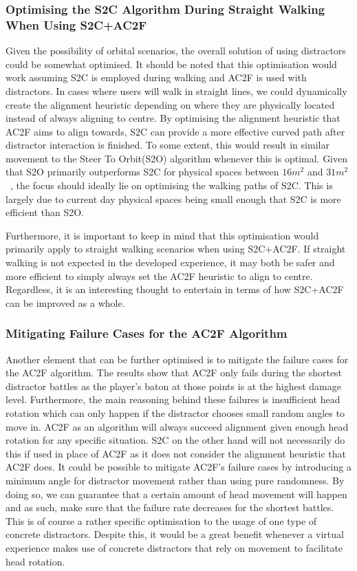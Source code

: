 \subsubsection{Optimising the S2C Algorithm During Straight Walking When Using S2C+AC2F}
Given the possibility of orbital scenarios, the overall solution of using distractors could be somewhat optimised. It should be noted that this optimisation would work assuming S2C is employed during walking and AC2F is used with distractors. In cases where users will walk in straight lines, we could dynamically create the alignment heuristic depending on where they are physically located instead of always aligning to centre. By optimising the alignment heuristic that AC2F aims to align towards, S2C can provide a more effective curved path after distractor interaction is finished. To some extent, this would result in similar movement to the Steer To Orbit(S2O) algorithm whenever this is optimal. Given that S2O primarily outperforms S2C for physical spaces between $16m^2$ and $31m^2$~\cite{azmandian2015physical}, the focus should ideally lie on optimising the walking paths of S2C. This is largely due to current day physical spaces being small enough that S2C is more efficient than S2O.   

Furthermore, it is important to keep in mind that this optimisation would primarily apply to straight walking scenarios when using S2C+AC2F. If straight walking is not expected in the developed experience, it may both be safer and more efficient to simply always set the AC2F heuristic to align to centre. Regardless, it is an interesting thought to entertain in terms of how S2C+AC2F can be improved as a whole. 

\subsubsection{Mitigating Failure Cases for the AC2F Algorithm}
Another element that can be further optimised is to mitigate the failure cases for the AC2F algorithm. The results show that AC2F only fails during the shortest distractor battles as the player's baton at those points is at the highest damage level. Furthermore, the main reasoning behind these failures is insufficient head rotation which can only happen if the distractor chooses small random angles to move in. AC2F as an algorithm will always succeed alignment given enough head rotation for any specific situation. S2C on the other hand will not necessarily do this if used in place of AC2F as it does not consider the alignment heuristic that AC2F does. It could be possible to mitigate AC2F's failure cases by introducing a minimum angle for distractor movement rather than using pure randomness. By doing so, we can guarantee that a certain amount of head movement will happen and as such, make sure that the failure rate decreases for the shortest battles. This is of course a rather specific optimisation to the usage of one type of concrete distractors. Despite this, it would be a great benefit whenever a virtual experience makes use of concrete distractors that rely on movement to facilitate head rotation. 


